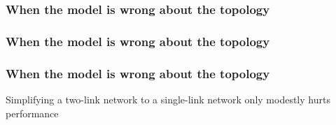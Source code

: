 \begin{frame}
\frametitle{When the model is wrong about the topology}
\large
\begin{centering}

\textcolor{DarkBlue}{}

\end{centering}
\vspace{\baselineskip}
\vspace{\baselineskip}


\end{frame}

\begin{frame}
\frametitle{When the model is wrong about the topology}
\begin{centering}

\noindent {}

\end{centering}
\end{frame}

\begin{frame}
\frametitle{When the model is wrong about the topology}
\begin{centering}

Simplifying a two-link network to a single-link network only modestly hurts performance

\end{centering}
\end{frame}
